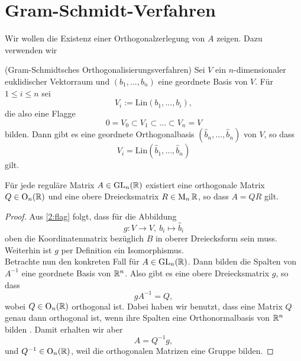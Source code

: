 \section{Gram-Schmidt-Verfahren}
Wir wollen die Existenz einer Orthogonalzerlegung von $A$ zeigen.
\color{purple}
Dazu verwenden wir \cite[11.32]{schroer}
\begin{prop}(Gram-Schmidtsches Orthogonalisierungsverfahren) Sei $V$ ein $n$-dimensionaler euklidischer Vektorraum und $(b_1,...,b_n)$ eine geordnete Basis von $V$. Für $1\leq i\leq n$ sei
  \[
  V_i:= \mathrm{Lin}(b_1,...,b_i),
  \]
  die also eine Flagge
  \[
  0=V_0\subset V_1\subset...\subset V_n = V
  \]
  bilden. Dann gibt es eine geordnete Orthogonalbasis $(\hat{b}_n,...,\hat{b}_n)$ von $V$, so dass
  \begin{equation}\label{2:flag}\tag{$\ast$}
  V_i = \mathrm{Lin}(\hat{b}_1,...,\hat{b}_n)
  \end{equation}
  gilt.
\end{prop}
\begin{thm}
  Für jede reguläre Matrix $A\in\operatorname{GL}_n(\mathbb{R})$ existiert eine orthogonale Matrix $Q\in \operatorname{O}_{n}(\mathbb{R})$ und eine obere Dreiecksmatrix $R\in \operatorname{M}_n{\mathbb{R}}$, so dass $A=QR$ gilt.
\end{thm}
\begin{proof}
  Aus \eqref{2:flag} folgt, dass für die Abbildung
  \[
  g:V\to V,~b_i\mapsto \hat{b}_i
  \] oben die Koordinatenmatrix bezüglich $B$ in oberer Dreiecksform sein muss. Weiterhin ist $g$ per Definition ein Isomorphismus.\\
  Betrachte nun den konkreten Fall für $A\in \operatorname{GL}_{n}(\mathbb{R})$. Dann bilden die Spalten von $A^{-1}$ eine geordnete Basis von $\mathbb{R}^n$. Also gibt es eine obere Dreiecksmatrix $g$, so dass
  \[gA^{-1}=Q,\]
  wobei $Q\in \operatorname{O}_{n}(\mathbb{R})$ orthogonal ist. Dabei haben wir benutzt, dass eine Matrix $Q$ genau dann orthogonal ist, wenn ihre Spalten eine Orthonormalbasis von $\mathbb{R}^n$ bilden \cite[11.34]{schroer }. Damit erhalten wir aber
  \[
  A=Q^{-1}g,\]
  und $Q^{-1}\in \operatorname{O}_{n}(\mathbb{R})$, weil die orthogonalen Matrizen eine Gruppe bilden.
\end{proof}
\color{black}

